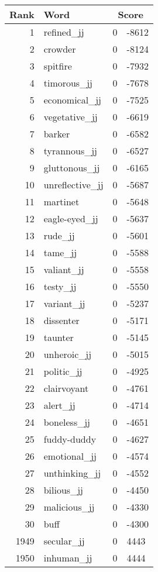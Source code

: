 \begin{longtable}[!htbp]{| rlr@{.}l |}
    \hline
    \textbf{Rank} & \textbf{Word} & \multicolumn{2}{c|}{\textbf{Score}} \\
    \hline
    \endhead
    1 & refined\_jj & 0 & -8612 \\
    2 & crowder & 0 & -8124 \\
    3 & spitfire & 0 & -7932 \\
    4 & timorous\_jj & 0 & -7678 \\
    5 & economical\_jj & 0 & -7525 \\
    6 & vegetative\_jj & 0 & -6619 \\
    7 & barker & 0 & -6582 \\
    8 & tyrannous\_jj & 0 & -6527 \\
    9 & gluttonous\_jj & 0 & -6165 \\
    10 & unreflective\_jj & 0 & -5687 \\
    11 & martinet & 0 & -5648 \\
    12 & eagle-eyed\_jj & 0 & -5637 \\
    13 & rude\_jj & 0 & -5601 \\
    14 & tame\_jj & 0 & -5588 \\
    15 & valiant\_jj & 0 & -5558 \\
    16 & testy\_jj & 0 & -5550 \\
    17 & variant\_jj & 0 & -5237 \\
    18 & dissenter & 0 & -5171 \\
    19 & taunter & 0 & -5145 \\
    20 & unheroic\_jj & 0 & -5015 \\
    21 & politic\_jj & 0 & -4925 \\
    22 & clairvoyant & 0 & -4761 \\
    23 & alert\_jj & 0 & -4714 \\
    24 & boneless\_jj & 0 & -4651 \\
    25 & fuddy-duddy & 0 & -4627 \\
    26 & emotional\_jj & 0 & -4574 \\
    27 & unthinking\_jj & 0 & -4552 \\
    28 & bilious\_jj & 0 & -4450 \\
    29 & malicious\_jj & 0 & -4330 \\
    30 & buff & 0 & -4300 \\
    1949 & secular\_jj & 0 & 4443 \\
    1950 & inhuman\_jj & 0 & 4444 \\

\end{longtable}
